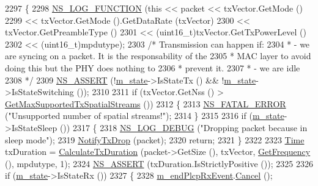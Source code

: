 \begin{DoxyCode}
2297 \{
2298   \hyperlink{log-macros-disabled_8h_a90b90d5bad1f39cb1b64923ea94c0761}{NS\_LOG\_FUNCTION} (\textcolor{keyword}{this} << packet << txVector.GetMode ()
2299                         << txVector.GetMode ().GetDataRate (txVector)
2300                         << txVector.GetPreambleType ()
2301                         << (uint16\_t)txVector.GetTxPowerLevel ()
2302                         << (uint16\_t)mpdutype);
2303   \textcolor{comment}{/* Transmission can happen if:}
2304 \textcolor{comment}{   *  - we are syncing on a packet. It is the responsability of the}
2305 \textcolor{comment}{   *    MAC layer to avoid doing this but the PHY does nothing to}
2306 \textcolor{comment}{   *    prevent it.}
2307 \textcolor{comment}{   *  - we are idle}
2308 \textcolor{comment}{   */}
2309   \hyperlink{assert_8h_a6dccdb0de9b252f60088ce281c49d052}{NS\_ASSERT} (!\hyperlink{classns3_1_1WifiPhy_a020dae8902d858e3d121aa7a67ca2528}{m\_state}->IsStateTx () && !\hyperlink{classns3_1_1WifiPhy_a020dae8902d858e3d121aa7a67ca2528}{m\_state}->IsStateSwitching ());
2310 
2311   \textcolor{keywordflow}{if} (txVector.GetNss () > \hyperlink{classns3_1_1WifiPhy_ab5e6bb95a75d0e6e7e666efd3c014fe4}{GetMaxSupportedTxSpatialStreams} ())
2312     \{
2313       \hyperlink{group__fatal_ga5131d5e3f75d7d4cbfd706ac456fdc85}{NS\_FATAL\_ERROR} (\textcolor{stringliteral}{"Unsupported number of spatial streams!"});
2314     \}
2315 
2316   \textcolor{keywordflow}{if} (\hyperlink{classns3_1_1WifiPhy_a020dae8902d858e3d121aa7a67ca2528}{m\_state}->IsStateSleep ())
2317     \{
2318       \hyperlink{group__logging_ga413f1886406d49f59a6a0a89b77b4d0a}{NS\_LOG\_DEBUG} (\textcolor{stringliteral}{"Dropping packet because in sleep mode"});
2319       \hyperlink{classns3_1_1WifiPhy_a32d02a68271c4a8a42ec023e2b1b81e7}{NotifyTxDrop} (packet);
2320       \textcolor{keywordflow}{return};
2321     \}
2322 
2323   \hyperlink{namespacens3_1_1TracedValueCallback_a7ffd3e7c142ffe7c8a1d2db9b8de38ec}{Time} txDuration = \hyperlink{classns3_1_1WifiPhy_aee98c7241bb4f0bb8e6d90f5771dacc7}{CalculateTxDuration} (packet->GetSize (), txVector, 
      \hyperlink{classns3_1_1WifiPhy_ad2508d94faf22d690d6b8b4367934fd1}{GetFrequency} (), mpdutype, 1);
2324   \hyperlink{assert_8h_a6dccdb0de9b252f60088ce281c49d052}{NS\_ASSERT} (txDuration.IsStrictlyPositive ());
2325 
2326   \textcolor{keywordflow}{if} (\hyperlink{classns3_1_1WifiPhy_a020dae8902d858e3d121aa7a67ca2528}{m\_state}->IsStateRx ())
2327     \{
2328       \hyperlink{classns3_1_1WifiPhy_a82a8c191494752dc220bc3df57ea29cd}{m\_endPlcpRxEvent}.\hyperlink{classns3_1_1EventId_a993ae94e48e014e1afd47edb16db7a11}{Cancel} ();

\end{DoxyCode}

